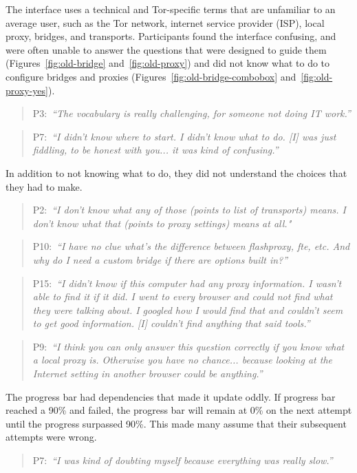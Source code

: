 \documentclass[USenglish,oneside,twocolumn]{article}
\newcommand{\pquote}[2]{
\begin{quotation}
\noindent #1:~\textit{#2}
\end{quotation}
}
\begin{document}
The interface uses a technical and Tor-specific terms that are unfamiliar to an average user, such as the Tor network, internet service provider (ISP), local proxy, bridges, and transports. Participants found the interface confusing, and were often unable to answer the questions that were designed to guide them (Figures~\ref{fig:old-bridge} and~\ref{fig:old-proxy}) and did not know what to do to configure bridges and proxies (Figures~\ref{fig:old-bridge-combobox} and~\ref{fig:old-proxy-yes}).

\pquote{P3}{``The vocabulary is really challenging, for someone not doing IT work.''}

\pquote{P7}{``I didn't know where to start. I didn't know what to do. [I] was just fiddling, to be honest with you... it was kind of confusing.''}

In addition to not knowing what to do, they did not understand the choices that they had to make. 

\pquote{P2}{``I don't know what any of those (points to list of transports) means. I don't know what that (points to proxy settings) means at all."}

\pquote{P10}{``I have no clue what's the difference between flashproxy, fte, etc. And why do I need a custom bridge if there are options built in?''}

\pquote{P15}{``I didn't know if this computer had any proxy information. I wasn't able to find it if it did. I went to every browser and could not find what they were talking about. I googled how I would find that and couldn't seem to get good information. [I] couldn't find anything that said tools.''}

\pquote{P9}{``I think you can only answer this question correctly if you know what a local proxy is.
Otherwise you have no chance... because looking at the Internet setting in another browser could be anything.''}

The progress bar had dependencies that made it update oddly. If progress bar reached a 90\% and failed, the progress bar will remain at 0\% on the next attempt until the progress surpassed 90\%. This made many assume that their subsequent attempts were wrong.

\pquote{P7}{``I was kind of doubting myself because everything was really slow.''}
\end{document}
